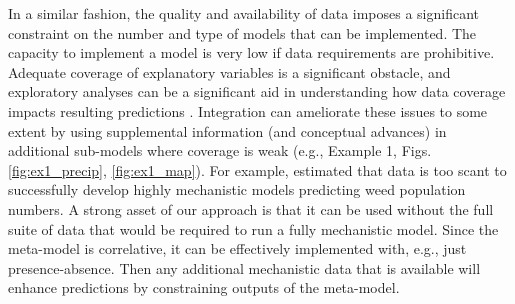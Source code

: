 In a similar fashion, the quality and availability of data imposes a significant constraint on the number and type of models that can be implemented.
The capacity to implement a model is very low if data requirements are prohibitive. 
Adequate coverage of explanatory variables is a significant obstacle, and exploratory analyses can be a significant aid in understanding how data coverage impacts resulting predictions \citep{Mckenney2002}.
Integration can ameliorate these issues to some extent by using supplemental information (and conceptual advances) in additional sub-models where coverage is weak (e.g., Example 1, Figs. \ref{fig:ex1_precip}, \ref{fig:ex1_map}).
For example, \citet{Freckleton2009} estimated that data is too scant to successfully develop highly mechanistic models predicting weed population numbers. 
A strong asset of our approach is that it can be used without the full suite of data that would be required to run a fully mechanistic model. 
Since the meta-model is correlative, it can be effectively implemented with, e.g., just  presence-absence. 
Then any additional mechanistic data that is available will enhance predictions by constraining outputs of the meta-model. 

